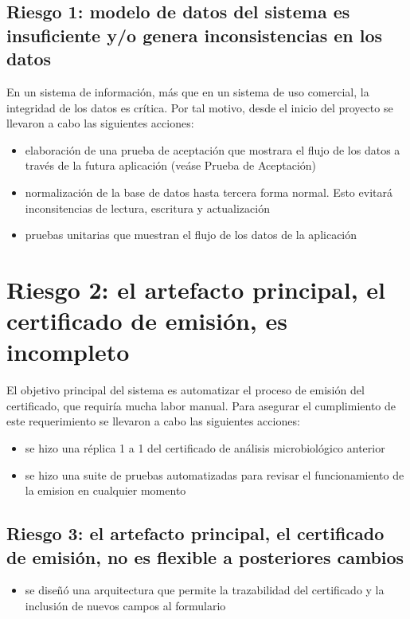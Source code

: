 \documentclass[letterpaper,10pt,spanish]{sphinxmanual}
\begin{document}
\subsection{Riesgo 1:  modelo de datos del sistema es insuficiente y/o genera inconsistencias en los datos}
\label{\detokenize{requerimientos/resumen_validacion:riesgo-1-modelo-de-datos-del-sistema-es-insuficiente-y-o-genera-inconsistencias-en-los-datos}}
En un sistema de información, más que en un sistema de uso comercial, la integridad de los datos
es crítica. Por tal motivo, desde el inicio del proyecto se llevaron a cabo las siguientes acciones:
\begin{itemize}
\item {} 
elaboración de una prueba de aceptación que mostrara el flujo de los
datos a través de la futura aplicación (veáse Prueba de Aceptación)

\item {} 
normalización de la base de datos hasta tercera forma normal. Esto
evitará inconsitencias de lectura, escritura y actualización

\item {} 
pruebas unitarias que muestran el flujo de los datos de la aplicación

\end{itemize}


\section{Riesgo 2: el artefacto principal, el certificado de emisión, es incompleto}
\label{\detokenize{requerimientos/resumen_validacion:riesgo-2-el-artefacto-principal-el-certificado-de-emision-es-incompleto}}
El objetivo principal del sistema es automatizar el proceso de emisión del certificado, que requiría
mucha labor manual. Para asegurar el cumplimiento de este requerimiento se llevaron a cabo las siguientes acciones:
\begin{itemize}
\item {} 
se hizo una réplica 1 a 1 del certificado de análisis microbiológico anterior

\item {} 
se hizo una suite de pruebas automatizadas para revisar el funcionamiento de la emision en cualquier momento

\end{itemize}


\subsection{Riesgo 3: el artefacto principal, el certificado de emisión, no es flexible a posteriores cambios}
\label{\detokenize{requerimientos/resumen_validacion:riesgo-3-el-artefacto-principal-el-certificado-de-emision-no-es-flexible-a-posteriores-cambios}}\begin{itemize}
\item {} 
se diseñó una arquitectura que permite la trazabilidad del certificado y la inclusión de nuevos campos al formulario

\end{itemize}
\end{document}
